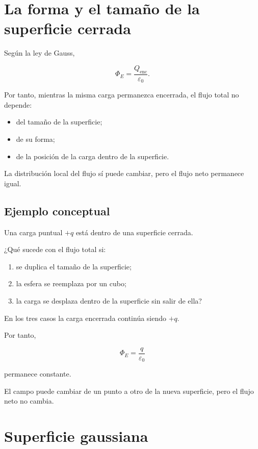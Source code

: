 \section{La forma y el tamaño de la superficie cerrada}

Según la ley de Gauss,

\[
\Phi_E=\frac{Q_{\text{enc}}}{\varepsilon_0}.
\]

Por tanto, mientras la misma carga permanezca encerrada, el flujo total no depende:

\begin{itemize}
    \item del tamaño de la superficie;
    \item de su forma;
    \item de la posición de la carga dentro de la superficie.
\end{itemize}

La distribución local del flujo sí puede cambiar, pero el flujo neto permanece igual.


\subsection{Ejemplo conceptual}

\begin{ejemplo}

Una carga puntual \(+q\) está dentro de una superficie cerrada.

¿Qué sucede con el flujo total si:

\begin{enumerate}
    \item se duplica el tamaño de la superficie;
    \item la esfera se reemplaza por un cubo;
    \item la carga se desplaza dentro de la superficie sin salir de ella?
\end{enumerate}

\end{ejemplo}

En los tres casos la carga encerrada continúa siendo \(+q\).

Por tanto,

\[
\boxed{\Phi_E=\frac{q}{\varepsilon_0}}
\]

permanece constante.

El campo puede cambiar de un punto a otro de la nueva superficie, pero el flujo neto
no cambia.


\section{Superficie gaussiana}

